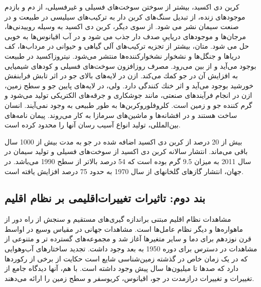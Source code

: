 		كربن دى اكسید، بیشتر از سوختن سوخت‌هاى فسیلى و غیرفسیلى، از دم و بازدم موجودهاى زنده، از تبدیل سنگ‌هاى كربن دار به تركیب‌هاى سیلیسى در طبیعت و در صنعت سیمان نشر مى شود. از سوى دیگر، كربن دى اكسید به وسیله روییدنى‌ها، مرجان‌ها و موجودهاى دریایىِ صدف دار جذب مى شود و در آب اقیانوس‌ها به خوبى حل مى شود. متان، بیشتر از تجزیه تركیب‌هاى آلى گیاهى و حیوانى در مرداب‌ها، كف دریاها و جنگل‌ها و نشخوار نشخواركننده‌ها منتشر می‌شود. نیتروزاكسید در طبیعت بوجود مى‌آید و از بین مى‌رود. مصرف روزافزون سوخت‌هاى فسیلى و كودهاى شیمیایى به افزایش آن در جو كمك مى‌كند. ازن در لایه‌هاى بالاى جو در اثر تابش فرابنفش خورشید بوجود مى‌آید و اثر خنك كنندگى دارد. ولى، در لایه‌هاى پایین جو و سطح زمین، ازن در انجام فرآیندهاى صنعتى، مانند جوشكارى و جرقه‌هاى الكتریكى تولید مى‌شود و گرم کننده جو و زمین است. كلروفلوروكربن‌ها به طور طبیعى به وجود نمى‌آیند. انسان ساخت هستند و در افشانه‌ها و ماشین‌هاى سرمازا به‌ كار می‌روند. پیمان نامه‌هاى بین‌المللى، تولید انواع آسیب رسان آنها را محدود كرده است.
		
		
		بیش از 20 درصد از کربن دی اکسید اضافه شده در جو به مدت بیش از 1000 سال باقی می‌ماند. انتشار سالانه کربن دی اکسید از سوخت‌های فسیلی و تولید سیمان در سال 2011 به میزان 9.5 گرم بوده است که 54 درصد بالاتر از سطح 1990 می‌باشد. در جهان، انتشار گازهای گلخانهای از سال 1970 به حدود 75 درصد افزایش یافته است.
		















	\subsection*{بند دوم: تاثیرات تغییرات‌اقلیمی  بر نظام اقلیم}
	
	
	
	مشاهدات نظام اقلیم مبتنی بر‌اندازه گیری‌های مستقیم و سنجش از راه دور از ماهواره‌ها و دیگر نظام عامل‌ها است. مشاهدات جهانی در مقیاس وسیع در اواسط قرن نوزدهم برای دما و سایر متغیرها آغاز شد و مجموعه‌های گسترده تر و متنوعی از مشاهدات در دسترس برای دوره 1950 به بعد وجود داشت. تجدید ساختارهای آب‌و‌هوایی که در یک زمان خاص در گذشته زمین‌شناسی شایع است حکایت از برخی از رکورد‌ها دارد که صدها تا میلیون‌ها سال پیش وجود داشته است. با هم، آنها دیدگاه جامع از تغییرات و تغییرات درازمدت در جو، اقیانوس، کریوسفر و سطح زمین را ارائه می‌دهند.
	
